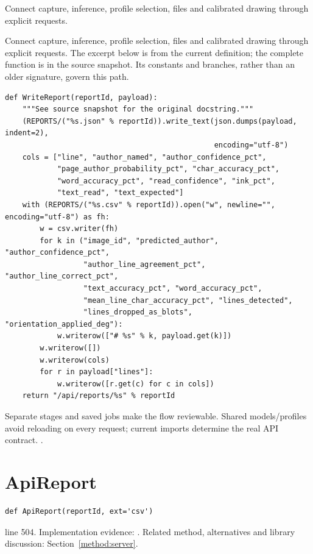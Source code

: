 Connect capture, inference, profile selection, files and calibrated drawing through explicit requests.


Connect capture, inference, profile selection, files and calibrated drawing through explicit requests. The excerpt below is from the current definition; the complete function is in the source snapshot. Its constants and branches, rather than an older signature, govern this path.


\begin{lstlisting}[style=plain]
def WriteReport(reportId, payload):
    """See source snapshot for the original docstring."""
    (REPORTS/("%s.json" % reportId)).write_text(json.dumps(payload, indent=2),
                                                encoding="utf-8")
    cols = ["line", "author_named", "author_confidence_pct",
            "page_author_probability_pct", "char_accuracy_pct",
            "word_accuracy_pct", "read_confidence", "ink_pct",
            "text_read", "text_expected"]
    with (REPORTS/("%s.csv" % reportId)).open("w", newline="", encoding="utf-8") as fh:
        w = csv.writer(fh)
        for k in ("image_id", "predicted_author", "author_confidence_pct",
                  "author_line_agreement_pct", "author_line_correct_pct",
                  "text_accuracy_pct", "word_accuracy_pct",
                  "mean_line_char_accuracy_pct", "lines_detected",
                  "lines_dropped_as_blots", "orientation_applied_deg"):
            w.writerow(["# %s" % k, payload.get(k)])
        w.writerow([])
        w.writerow(cols)
        for r in payload["lines"]:
            w.writerow([r.get(c) for c in cols])
    return "/api/reports/%s" % reportId
\end{lstlisting}
Separate stages and saved jobs make the flow reviewable. Shared models/profiles avoid reloading on every request; current imports determine the real API contract. \cite{flaskdocs,pillowops,code2026}.


\section{ApiReport}\label{fn:web-server:ApiReport}
\begin{lstlisting}[style=sig]
def ApiReport(reportId, ext='csv')
\end{lstlisting}
 line 504. Implementation evidence: \cite{code2026}. Related method, alternatives and library discussion: Section~\ref{method:server}.


